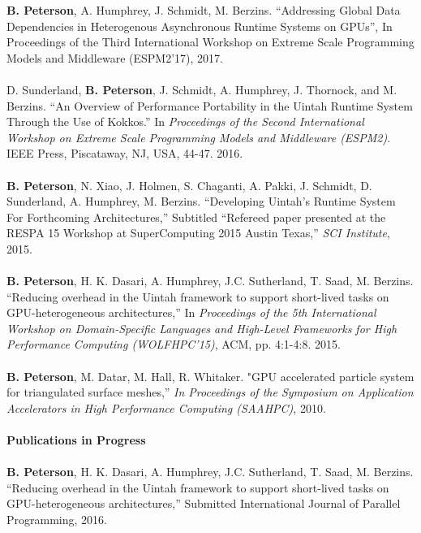 \documentclass[12pt]{article}
\begin{document}
\textbf{B. Peterson}, A. Humphrey, J. Schmidt, M. Berzins.  “Addressing Global Data Dependencies in Heterogenous Asynchronous Runtime Systems on GPUs”, In {Proceedings of the Third International Workshop on Extreme Scale Programming Models and Middleware (ESPM2'17)}, 2017. \\
\\
D. Sunderland, \textbf{B. Peterson}, J. Schmidt, A. Humphrey, J. Thornock, and M. Berzins. “An Overview of Performance Portability in the Uintah Runtime System Through the Use of Kokkos.”  In \textit{Proceedings of the Second International Workshop on Extreme Scale Programming Models and Middleware (ESPM2)}. IEEE Press, Piscataway, NJ, USA, 44-47. 2016.\\
\\
\textbf{B. Peterson}, N. Xiao, J. Holmen, S. Chaganti, A. Pakki, J. Schmidt, D. Sunderland, A. Humphrey, M. Berzins. “Developing Uintah’s Runtime System For Forthcoming Architectures,” Subtitled “Refereed paper presented at the RESPA 15 Workshop at SuperComputing 2015 Austin Texas,” \textit{SCI Institute}, 2015.\\
\\
\textbf{B. Peterson}, H. K. Dasari, A. Humphrey, J.C. Sutherland, T. Saad, M. Berzins. “Reducing overhead in the Uintah framework to support short-lived tasks on GPU-heterogeneous architectures,” In \textit{Proceedings of the 5th International Workshop on Domain-Specific Languages and High-Level Frameworks for High Performance Computing (WOLFHPC'15)}, ACM, pp. 4:1-4:8. 2015.\\
\\
\textbf{B. Peterson}, M. Datar, M. Hall, R. Whitaker.  "GPU accelerated particle system for triangulated surface meshes,” \textit{In Proceedings of the Symposium on Application Accelerators in High Performance Computing (SAAHPC)}, 2010.\\
\\
\textbf{Publications in Progress}\\
\\
\textbf{B. Peterson}, H. K. Dasari, A. Humphrey, J.C. Sutherland, T. Saad, M. Berzins. “Reducing overhead in the Uintah framework to support short-lived tasks on GPU-heterogeneous architectures,” Submitted International Journal of Parallel Programming, 2016.\\



\end{document}
